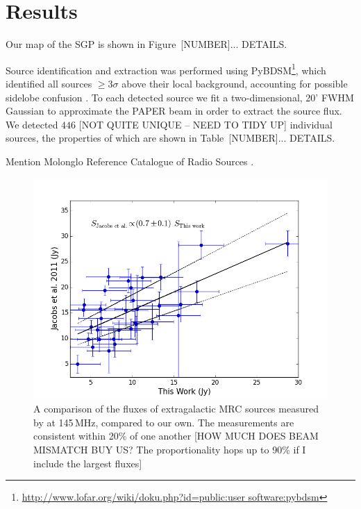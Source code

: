 \documentclass[preprint2,epsf,epsfig,graphics]{emulateapj}
\begin{document}
\section{Results}
\label{sec:res}

Our map of the SGP is shown in Figure~{\color{red}[NUMBER]... DETAILS}.

Source identification and extraction was performed using PyBDSM\footnote{\url{http://www.lofar.org/wiki/doku.php?id=public:user software:pybdsm}}, which identified all sources $\geq3\sigma$ above their local background, accounting for possible sidelobe confusion \citep{PyBDSM.15}. To each detected source we fit a two-dimensional, 20' FWHM Gaussian to approximate the PAPER beam \citep{Parsons.10} in order to extract the source flux. We detected $446$ {\color{red} [NOT QUITE UNIQUE -- NEED TO TIDY UP]} individual sources, the properties of which are shown in Table~{\color{red}[NUMBER]... DETAILS}. 

Mention Molonglo Reference Catalogue of Radio Sources \citep[MRC][]{Large.81} .

\begin{figure}
\includegraphics[width=\columnwidth]{us_and_danny_cal.png}
\caption{A comparison of the fluxes of extragalactic MRC sources measured by \cite{Jacobs.11} at 145\,MHz, compared to our own. The measurements are consistent within 20\% of one another {\color{red}[HOW MUCH DOES BEAM MISMATCH BUY US? The proportionality hops up to 90\% if I include the largest fluxes]}}
\end{figure}
\end{document}
